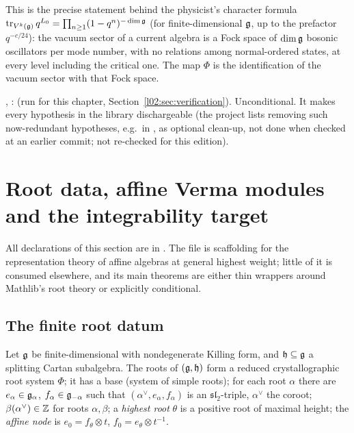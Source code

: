 \begin{physics}
This is the precise statement behind the physicist's character formula
$\operatorname{tr}_{V^k(\mathfrak{g})}q^{L_0} = \prod_{n\ge1}(1-q^n)^{-\dim\mathfrak{g}}$ (for finite-dimensional $\mathfrak{g}$, up to the
prefactor $q^{-c/24}$): the vacuum sector of a current algebra is a Fock space of $\dim\mathfrak{g}$ bosonic
oscillators per mode number, with no relations among normal-ordered states, at every level including the
critical one. The map $\Phi$ is the identification of the vacuum sector with that Fock space.
\end{physics}

\begin{status}
, \allowbreak{}\allowbreak{}:  (run for this chapter, Section~\ref{l02:sec:verification}). Unconditional. It makes every
 hypothesis in the library dischargeable (the project lists removing such now-redundant
hypotheses, e.g.\ in , as optional clean-up, not done
when checked at an earlier commit; not re-checked for this edition).
\end{status}

\section{Root data, affine Verma modules and the integrability target}\label{l02:sec:roots}

All declarations of this section are in . The file
is scaffolding for the representation theory of affine algebras at general highest weight; little of
it is consumed elsewhere, and its main theorems are either thin wrappers around Mathlib's root theory or
explicitly conditional.

\subsection{The finite root datum}

\begin{definition}\label{l02:def:roots}
Let $\mathfrak{g}$ be finite-dimensional with nondegenerate Killing form, and $\mathfrak h\subseteq\mathfrak{g}$ a
splitting Cartan subalgebra. The roots of $(\mathfrak{g},\mathfrak h)$ form a reduced crystallographic root
system $\Phi$; it has a base (system of simple roots); for each root $\alpha$ there are $e_\alpha\in\mathfrak{g}_\alpha$,
$f_\alpha\in\mathfrak{g}_{-\alpha}$ such that $(\alpha^\vee, e_\alpha, f_\alpha)$ is an $\mathfrak{sl}_2$-triple, $\alpha^\vee$ the
coroot; $\beta(\alpha^\vee)\in{\mathbb{Z}}$ for roots $\alpha,\beta$; a \emph{highest root} $\theta$ is a positive root of
maximal height; the \emph{affine node} is $e_0 = f_\theta\otimes t$, $f_0 = e_\theta\otimes t^{-1}$.
\end{definition}

